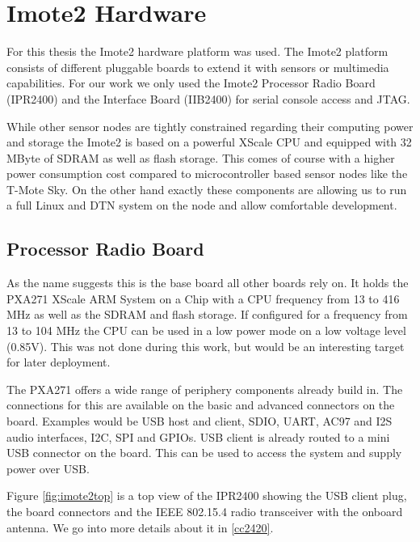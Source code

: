 \chapter{Imote2 Hardware}
For this thesis the Imote2 hardware platform was used. The Imote2 platform
consists of different pluggable boards to extend it with sensors or multimedia
capabilities. For our work we only used the Imote2 Processor Radio Board
(IPR2400) and the Interface Board (IIB2400) for serial console access and JTAG.

While other sensor nodes are tightly constrained regarding their computing power
and storage the Imote2 is based on a powerful XScale CPU and equipped with 32
MByte of SDRAM as well as flash storage. This comes of course with a higher power
consumption cost compared to microcontroller based sensor nodes like the T-Mote
Sky. On the other hand exactly these components are allowing us to run a full
Linux and DTN system on the node and allow comfortable development.

\section{Processor Radio Board}
As the name suggests this is the base board all other boards rely on. It holds
the PXA271 XScale ARM System on a Chip with a CPU frequency from 13 to 416 MHz
as well as the SDRAM and flash storage. If configured for a frequency from 13
to 104 MHz the CPU can be used in a low power mode on a low voltage level
(0.85V). This was not done during this work, but would be an interesting target
for later deployment.

The PXA271 offers a wide range of periphery components already build in. The
connections for this are available on the basic and advanced connectors on the
board. Examples would be USB host and client, SDIO, UART, AC97 and I2S audio
interfaces, I2C, SPI and GPIOs. USB client is already routed to a mini USB
connector on the board. This can be used to access the system and supply power
over USB.

Figure \ref{fig:imote2top} is a top view of the IPR2400 showing the USB client plug,
the board connectors and the IEEE 802.15.4 radio transceiver with the onboard
antenna. We go into more details about it in \ref{cc2420}.

